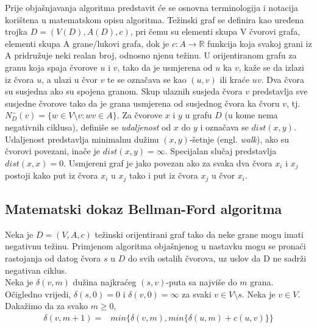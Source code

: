 \documentclass[conference]{IEEEtran}
\begin{document}
Prije objašnjavanja algoritma predstavit će se osnovna terminologija i notacija korištena u matematskom opisu algoritma. Težinski graf se definira kao uređena trojka $D = (V(D), A(D), c)$, pri čemu su elementi skupa V čvorovi grafa, elementi skupa A grane/lukovi grafa, dok je $c : A \rightarrow \mathbb{R} $ funkcija koja svakoj grani iz A pridružuje neki realan broj, odnosno njenu težinu\cite{dm}. U orijentiranom grafu za granu koja spaja čvorove $u$ i $v$, tako da je usmjerena od $u$ ka $v$, kaže se da izlazi iz čvora $u$, a ulazi u čvor $v$ te se označava se kao $(u, v)$ ili kraće $uv$. Dva čvora su susjedna ako su spojena granom. Skup ulaznih susjeda čvora $v$ predstavlja sve susjedne čvorove tako da je grana usmjerena od susjednog čvora ka čvoru $v$, tj. $N_D^-(v) = \{w \in V\setminus v : wv \in A\}$. Za čvorove $x$ i $y$ u grafu $D$ (u kome nema negativnih ciklusa), definiše se \emph{udaljenost} od $x$ do $y$ i označava se $dist(x,y).$
Udaljenost predstavlja minimalnu dužinu $(x,y)$-šetnje (engl. \emph{walk}), ako su čvorovi povezani, inače je $dist(x,y) = \infty$. Specijalan slučaj predstavlja $dist(x,x)=0$\cite{bang2008digraphs}. Usmjereni graf je jako povezan ako za svaka dva čvora $x_i$ i $x_j$ postoji kako put iz čvora $x_i$ u $x_j$ tako i put iz čvora $x_j$ u čvor $x_i$\cite{dm}.

\subsection{Matematski dokaz Bellman-Ford algoritma}

Neka je $D = (V, A, c)$ težinski orijentirani graf tako da neke grane mogu imati negativnu težinu. Primjenom algoritma objašnjenog u nastavku mogu se pronaći rastojanja od datog čvora $s$ u $D$ do svih ostalih čvorova, uz uslov da D ne sadrži negativan ciklus. \\
Neka je $\delta(v,m)$ dužina najkraćeg $(s,v)$-puta sa najviše do $m$ grana. Očigledno vrijedi, $\delta(s,0)=0$ i $\delta(v, 0) = \infty$ za svaki $v \in V \setminus s$. Neka je $v \in V$. Dakažimo da za svako $m \geq 0$, 
\begin{equation}\label{eq:eq1}
    \begin{split}
    \delta(v, m+1) =&min \{ \delta(v, m), min \{ \delta(u, m) + c(u, v)\}\} \\
\end{split}
\end{equation}
\end{document}
